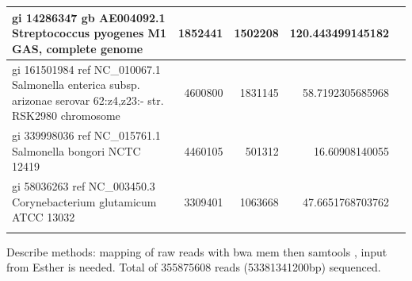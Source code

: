 \documentclass{bioinfo2}
\begin{document}
\begin{table}[p]
{\begin{tabular}{lrrrr}
\hline
gi 14286347 gb AE004092.1  Streptococcus pyogenes M1 GAS, complete genome & 1852441 & 1502208 & 120.443499145182 \\
\hline
gi 161501984 ref NC\_010067.1  Salmonella enterica subsp. arizonae serovar 62:z4,z23:- str. RSK2980 chromosome & 4600800 & 1831145 & 58.7192305685968 \\
\hline
gi 339998036 ref NC\_015761.1  Salmonella bongori NCTC 12419 & 4460105 & 501312 & 16.60908140055 \\
\hline
gi 58036263 ref NC\_003450.3  Corynebacterium glutamicum ATCC 13032 & 3309401 & 1063668 & 47.6651768703762 \\
\botrule
\end{tabular}}{Describe methods: mapping of raw reads with bwa mem \citep{bwamem} then samtools \citep{samtools},
input from Esther is needed. 
Total of 355875608 reads (53381341200bp) sequenced.
}
\end{table}
\end{document}
